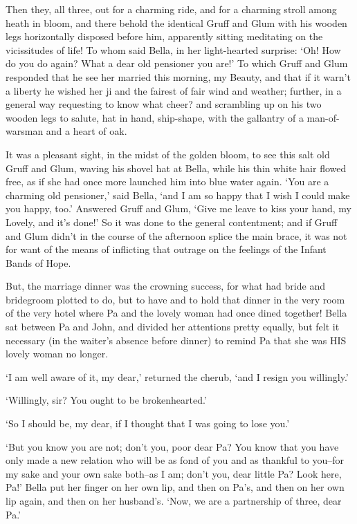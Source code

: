 Then they, all three, out for a charming ride, and for a charming stroll
among heath in bloom, and there behold the identical Gruff and Glum with
his wooden legs horizontally disposed before him, apparently sitting
meditating on the vicissitudes of life! To whom said Bella, in her
light-hearted surprise: ‘Oh! How do you do again? What a dear old
pensioner you are!’ To which Gruff and Glum responded that he see her
married this morning, my Beauty, and that if it warn’t a liberty he
wished her ji and the fairest of fair wind and weather; further, in a
general way requesting to know what cheer? and scrambling up on his two
wooden legs to salute, hat in hand, ship-shape, with the gallantry of a
man-of-warsman and a heart of oak.

It was a pleasant sight, in the midst of the golden bloom, to see this
salt old Gruff and Glum, waving his shovel hat at Bella, while his thin
white hair flowed free, as if she had once more launched him into blue
water again. ‘You are a charming old pensioner,’ said Bella, ‘and I am
so happy that I wish I could make you happy, too.’ Answered Gruff and
Glum, ‘Give me leave to kiss your hand, my Lovely, and it’s done!’ So it
was done to the general contentment; and if Gruff and Glum didn’t in the
course of the afternoon splice the main brace, it was not for want of
the means of inflicting that outrage on the feelings of the Infant Bands
of Hope.

But, the marriage dinner was the crowning success, for what had bride
and bridegroom plotted to do, but to have and to hold that dinner in the
very room of the very hotel where Pa and the lovely woman had once dined
together! Bella sat between Pa and John, and divided her attentions
pretty equally, but felt it necessary (in the waiter’s absence before
dinner) to remind Pa that she was HIS lovely woman no longer.

‘I am well aware of it, my dear,’ returned the cherub, ‘and I resign you
willingly.’

‘Willingly, sir? You ought to be brokenhearted.’

‘So I should be, my dear, if I thought that I was going to lose you.’

‘But you know you are not; don’t you, poor dear Pa? You know that you
have only made a new relation who will be as fond of you and as thankful
to you--for my sake and your own sake both--as I am; don’t you, dear
little Pa? Look here, Pa!’ Bella put her finger on her own lip, and then
on Pa’s, and then on her own lip again, and then on her husband’s. ‘Now,
we are a partnership of three, dear Pa.’

